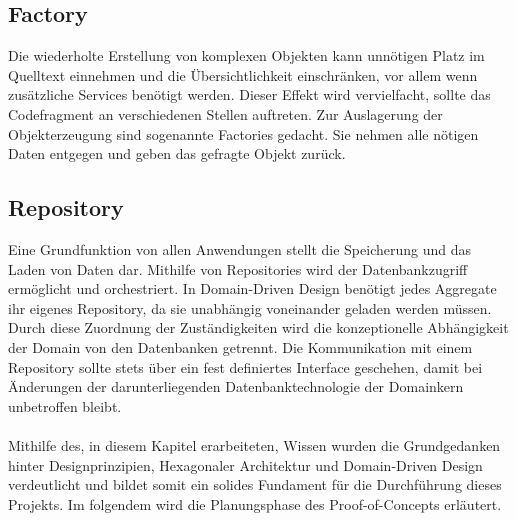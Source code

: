 \subsection{Factory}

Die wiederholte Erstellung von komplexen Objekten kann unnötigen Platz im Quelltext einnehmen und die Übersichtlichkeit einschränken, vor allem wenn zusätzliche Services benötigt werden. Dieser Effekt wird vervielfacht, sollte das Codefragment an verschiedenen Stellen auftreten. Zur Auslagerung der Objekterzeugung sind sogenannte Factories gedacht. Sie nehmen alle nötigen Daten entgegen und geben das gefragte Objekt zurück.

\subsection{Repository}

Eine Grundfunktion von allen Anwendungen stellt die Speicherung und das Laden von Daten dar. Mithilfe von Repositories wird der Datenbankzugriff ermöglicht und orchestriert. In Domain-Driven Design benötigt jedes Aggregate ihr eigenes Repository, da sie unabhängig voneinander geladen werden müssen. Durch diese Zuordnung der Zuständigkeiten wird die konzeptionelle Abhängigkeit der Domain von den Datenbanken getrennt. Die Kommunikation mit einem Repository sollte stets über ein fest definiertes Interface geschehen, damit bei Änderungen der darunterliegenden Datenbanktechnologie der Domainkern unbetroffen bleibt. \\\\

Mithilfe des, in diesem Kapitel erarbeiteten, Wissen wurden die Grundgedanken hinter Designprinzipien, Hexagonaler Architektur und Domain-Driven Design verdeutlicht und bildet somit ein solides Fundament für die Durchführung dieses Projekts. Im folgendem wird die Planungsphase des Proof-of-Concepts erläutert.
















































